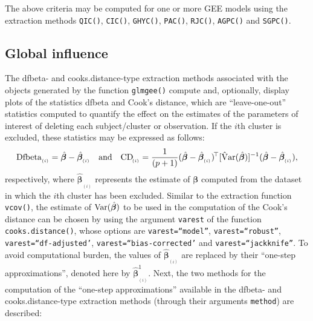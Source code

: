 \noindent The above criteria may be computed for one or more GEE models using the extraction methods {\tt QIC()}, 
{\tt CIC()}, {\tt GHYC()}, {\tt PAC()}, {\tt RJC()}, {\tt AGPC()} and {\tt SGPC()}.

\subsection{Global influence}\label{osa}
The dfbeta- and cooks.distance-type extraction methods associated with the objects generated by the function {\tt glmgee()} compute and, optionally, display plots of the statistics dfbeta and Cook's distance, which are ``leave-one-out'' statistics computed to quantify the effect on the estimates of the parameters of interest of deleting each subject/cluster or observation. If the $i$th cluster is excluded, these statistics may be expressed as follows:
$${\rm Dfbeta}_{_{(i)}}=\hat{\bm{\beta}}-\hat{\bm{\beta}}_{_{(i)}}\quad\textcolor{black}{\rm and}\quad {\rm CD}_{_{\!(i)}}=\frac{1}{(p+1)}(\hat{\bm{\beta}}-\hat{\bm{\beta}}_{_{(i)}})^{\!\top}[{\rm \hat{V}ar}(\hat{\bm{\beta}})]^{-1}(\hat{\bm{\beta}}-\hat{\bm{\beta}}_{_{(i)}}),$$
respectively, where $\hat{\bm{\beta}}_{_{(i)}}$ represents the estimate of $\bm{\beta}$ computed from the dataset in which the
$i$th cluster has been excluded. Similar to the extraction function {\tt vcov()}, the estimate of ${\rm Var}(\hat{\bm{\beta}})$ to be used in the computation of the Cook's distance can be chosen by using the argument {\tt varest} of the function {\tt cooks.distance()}, whose options are {\tt varest=``model''}, {\tt varest=``robust''}, {\tt varest=``df-adjusted'}, {\tt varest=``bias-corrected'} and {\tt varest=``jackknife''}.
To avoid computational burden, the values of $\hat{\bm{\beta}}_{_{(i)}}$ are 
replaced by their ``one-step approximations'', denoted here by $\hat{\bm{\beta}}_{_{(i)}}^{1}$.
Next, the two methods for the computation of the ``one-step approximations'' available in the dfbeta- and cooks.distance-type
extraction methods (through their arguments {\tt method}) are described:
